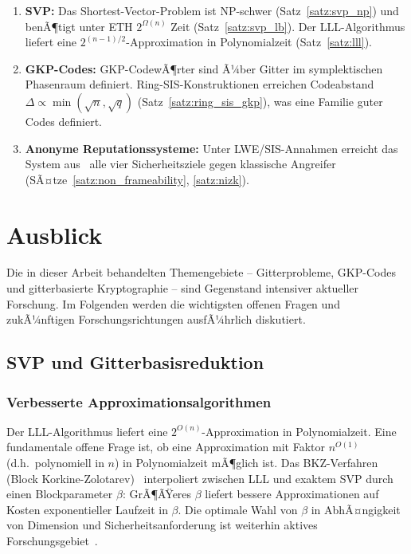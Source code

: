 ﻿\documentclass[a4paper,12pt]{article}
\theoremstyle{definition}
\begin{document}
\begin{enumerate}
    \item \textbf{SVP:}
          Das Shortest-Vector-Problem ist NP-schwer (Satz~\ref{satz:svp_np})
          und benÃ¶tigt unter ETH $2^{\Omega(n)}$ Zeit (Satz~\ref{satz:svp_lb}).
          Der LLL-Algorithmus liefert eine $2^{(n-1)/2}$-Approximation in Polynomialzeit
          (Satz~\ref{satz:lll}).

    \item \textbf{GKP-Codes:}
          GKP-CodewÃ¶rter sind Ã¼ber Gitter im symplektischen Phasenraum definiert.
          Ring-SIS-Konstruktionen erreichen Codeabstand $\Delta \propto \min(\sqrt{n}, \sqrt{q})$
          (Satz~\ref{satz:ring_sis_gkp}), was eine Familie guter Codes definiert.

    \item \textbf{Anonyme Reputationssysteme:}
          Unter LWE/SIS-Annahmen erreicht das System aus~\cite{BBP23} alle vier
          Sicherheitsziele gegen klassische Angreifer
          (SÃ¤tze~\ref{satz:non_frameability}, \ref{satz:nizk}).
\end{enumerate}

\section{Ausblick}

Die in dieser Arbeit behandelten Themengebiete -- Gitterprobleme, GKP-Codes und
gitterbasierte Kryptographie -- sind Gegenstand intensiver aktueller Forschung.
Im Folgenden werden die wichtigsten offenen Fragen und zukÃ¼nftigen Forschungsrichtungen
ausfÃ¼hrlich diskutiert.

\subsection{SVP und Gitterbasisreduktion}

\subsubsection{Verbesserte Approximationsalgorithmen}

Der LLL-Algorithmus liefert eine $2^{O(n)}$-Approximation in Polynomialzeit.
Eine fundamentale offene Frage ist, ob eine Approximation mit Faktor $n^{O(1)}$
(d.h.\ polynomiell in $n$) in Polynomialzeit mÃ¶glich ist.
Das BKZ-Verfahren (Block Korkine-Zolotarev)~\cite{Schnorr1994} interpoliert
zwischen LLL und exaktem SVP durch einen Blockparameter $\beta$:
GrÃ¶ÃŸeres $\beta$ liefert bessere Approximationen auf Kosten exponentieller
Laufzeit in $\beta$.
Die optimale Wahl von $\beta$ in AbhÃ¤ngigkeit von Dimension und Sicherheitsanforderung
ist weiterhin aktives Forschungsgebiet~\cite{Chen2011}.
\end{document}
